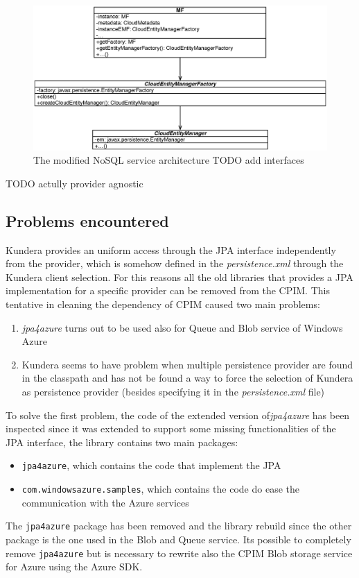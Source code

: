 \begin{figure}[tbh]
  \centering
  \includegraphics[width=14cm]{images/cpim_nosql_kundera}
  \caption{The modified NoSQL service architecture TODO add interfaces}
  \label{fig:cpim-kundera}
\end{figure}

TODO actully provider agnostic

\subsection{Problems encountered}
Kundera provides an uniform access through the JPA interface independently from the provider, which is somehow defined in the \textit{persistence.xml} through the Kundera client selection. For this reasons all the old libraries that provides a JPA implementation for a specific provider can be removed from the CPIM. 
This tentative in cleaning the dependency of CPIM caused two main problems:
\begin{enumerate}
\item \textit{jpa4azure} turns out to be used also for Queue and Blob service of Windows Azure
\item Kundera seems to have problem when multiple persistence provider are found in the classpath and has not be found a way to force the selection of Kundera as persistence provider (besides specifying it in the \textit{persistence.xml} file)
\end{enumerate} 

\noindent To solve the first problem, the code of the extended version of\textit{jpa4azure} has been inspected since it was extended to support some missing functionalities of the JPA interface, the library contains two main packages:
\begin{itemize}
\item \texttt{jpa4azure}, which contains the code that implement the JPA
\item \texttt{com.windowsazure.samples}, which contains the code do ease the communication with the Azure services
\end{itemize}
The \texttt{jpa4azure} package has been removed and the library rebuild since the other package is the one used in the Blob and Queue service. Its possible to completely remove \texttt{jpa4azure} but is necessary to rewrite also the CPIM Blob storage service for Azure using the Azure SDK.

